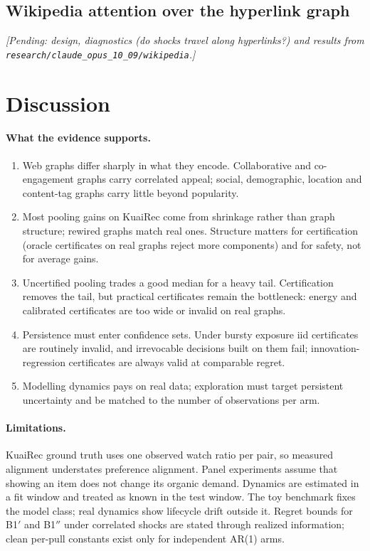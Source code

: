 \documentclass[11pt]{article}
\theoremstyle{definition}
\theoremstyle{remark}
\begin{document}
\subsection{Wikipedia attention over the hyperlink graph}\label{sec:wiki}

\textit{[Pending: design, diagnostics (do shocks travel along hyperlinks?) and results from \texttt{research/claude\_opus\_10\_09/wikipedia}.]}

\section{Discussion}

\paragraph{What the evidence supports.}
\begin{enumerate}
\item Web graphs differ sharply in what they encode. Collaborative and co-engagement graphs carry correlated appeal; social, demographic, location and content-tag graphs carry little beyond popularity.
\item Most pooling gains on KuaiRec come from shrinkage rather than graph structure; rewired graphs match real ones. Structure matters for certification (oracle certificates on real graphs reject more components) and for safety, not for average gains.
\item Uncertified pooling trades a good median for a heavy tail. Certification removes the tail, but practical certificates remain the bottleneck: energy and calibrated certificates are too wide or invalid on real graphs.
\item Persistence must enter confidence sets. Under bursty exposure iid certificates are routinely invalid, and irrevocable decisions built on them fail; innovation-regression certificates are always valid at comparable regret.
\item Modelling dynamics pays on real data; exploration must target persistent uncertainty and be matched to the number of observations per arm.
\end{enumerate}

\paragraph{Limitations.} KuaiRec ground truth uses one observed watch ratio per pair, so measured alignment understates preference alignment. Panel experiments assume that showing an item does not change its organic demand. Dynamics are estimated in a fit window and treated as known in the test window. The toy benchmark fixes the model class; real dynamics show lifecycle drift outside it. Regret bounds for B1$'$ and B1$''$ under correlated shocks are stated through realized information; clean per-pull constants exist only for independent AR(1) arms.
\end{document}
